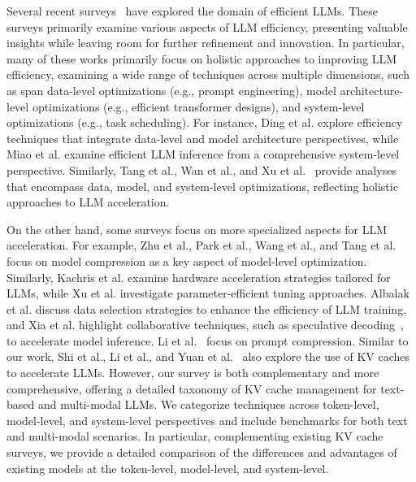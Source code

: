 Several recent surveys~\cite{zhu2023survey,zhuang2023survey,park2024comprehensive,wang2024model,ding2023efficiency,miao2023towards,wan2023efficient,zhou2024survey,tang2024survey,kachris2024survey,xu2023parameter,albalak2024survey,Awesome-LLM-Inference@2024} have explored the domain of efficient LLMs. These surveys primarily examine various aspects of LLM efficiency, presenting valuable insights while leaving room for further refinement and innovation.
In particular, many of these works
primarily focus on holistic approaches to improving LLM efficiency, examining a wide range of techniques across multiple dimensions, such as  span data-level optimizations (e.g., prompt engineering), model architecture-level optimizations (e.g., efficient transformer designs), and system-level optimizations (e.g., task scheduling).
For instance, Ding et al.\cite{ding2023efficiency} explore efficiency techniques that integrate data-level and model architecture perspectives, while Miao et al.\cite{miao2023towards} examine efficient LLM inference from a comprehensive system-level perspective. Similarly, Tang et al.\cite{tang2024survey}, Wan et al.\cite{wan2023efficient}, and Xu et al.~\cite{xu2023parameter} provide analyses that encompass data, model, and system-level optimizations, reflecting holistic approaches to LLM acceleration.

On the other hand, some surveys focus on more specialized aspects for LLM acceleration.
For example,
Zhu et al.\cite{zhu2023survey}, Park et al.\cite{park2024comprehensive}, Wang et al.\cite{wang2024model}, and Tang et al.\cite{tang2024survey} focus on model compression as a key aspect of model-level optimization. Similarly, Kachris et al.\cite{kachris2024survey} examine hardware acceleration strategies tailored for LLMs, while Xu et al.\cite{xu2023parameter} investigate parameter-efficient tuning approaches. Albalak et al.\cite{albalak2024survey} discuss data selection strategies to enhance the efficiency of LLM training, and Xia et al.\cite{xia2024unlocking} highlight collaborative techniques, such as speculative decoding~\cite{leviathan2023fast,kim2024speculative}, to accelerate model inference.
Li et al.~\cite{li2024prompt} focus on prompt compression.
Similar to our work, Shi et al.\cite{shi2024keep}, Li et al.\cite{li2024scbench}, and Yuan et al.~\cite{yuan2024kv} also explore the use of KV caches to accelerate LLMs. 
However, our survey is both complementary and more comprehensive, offering a detailed taxonomy of KV cache management for text-based and multi-modal LLMs.
We categorize techniques across token-level, model-level, and system-level perspectives and include benchmarks for both text and multi-modal scenarios.
In particular, complementing existing KV cache surveys, we provide a detailed comparison of the differences and advantages of existing models at the token-level, model-level, and system-level.







